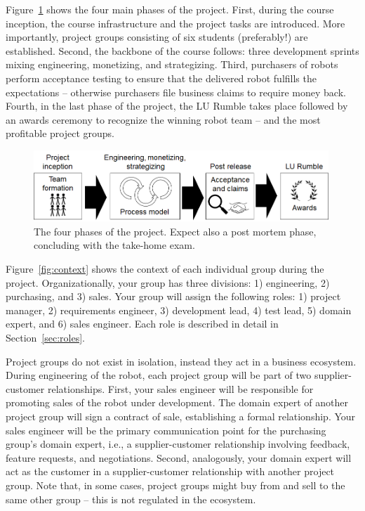 \documentclass{scrreprt}
\begin{document}
Figure~\ref{fig:overview} shows the four main phases of the project. First, during the course inception, the course infrastructure and the project tasks are introduced. More importantly, project groups consisting of six students (preferably!) are established. Second, the backbone of the course follows: three development sprints mixing engineering, monetizing, and strategizing. Third, purchasers of robots perform acceptance testing to ensure that the delivered robot fulfills the expectations -- otherwise purchasers file business claims to require money back. Fourth, in the last phase of the project, the LU Rumble takes place followed by an awards ceremony to recognize the winning robot team -- and the most profitable project groups.

\begin{figure}
\centering
\includegraphics[width=0.99\textwidth]{figures/projectOverview.png}
\caption{The four phases of the project. Expect also a post mortem phase, concluding with the take-home exam.}
\label{fig:overview}
\end{figure}

Figure~\ref{fig:context} shows the context of each individual group during the project. Organizationally, your group has three divisions: 1) engineering, 2) purchasing, and 3) sales. Your group will assign the following roles: 1) project manager, 2) requirements engineer, 3) development lead, 4) test lead, 5) domain expert, and 6) sales engineer. Each role is described in detail in Section~\ref{sec:roles}.

Project groups do not exist in isolation, instead they act in a business ecosystem. During engineering of the robot, each project group will be part of two supplier-customer relationships. First, your sales engineer will be responsible for promoting sales of the robot under development. The domain expert of another project group will sign a contract of sale, establishing a formal relationship. Your sales engineer will be the primary communication point for the purchasing group's domain expert, i.e., a supplier-customer relationship involving feedback, feature requests, and negotiations. Second, analogously, your domain expert will act as the customer in a supplier-customer relationship with another project group. Note that, in some cases, project groups might buy from and sell to the same other group -- this is not regulated in the ecosystem.
\end{document}
